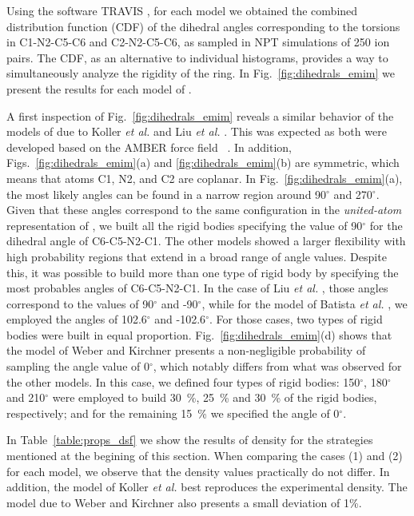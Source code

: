 \documentclass[3p,twocolumn]{elsarticle}
\begin{document}
Using the software TRAVIS \cite{Brehm_2011}, for each model we obtained the combined distribution function (CDF) of the dihedral angles corresponding to the torsions in C1-N2-C5-C6 and C2-N2-C5-C6, as sampled in NPT simulations of 250 ion pairs. The CDF, as an alternative to individual histograms, provides a way to  simultaneously analyze the rigidity of the ring. In Fig.~\ref{fig:dihedrals_emim} we present the results for each model of \ce{[emim][B(CN)_4]}.

A first inspection of Fig.~\ref{fig:dihedrals_emim} reveals a similar behavior of the models of \ce{[emim]^+} due to Koller \textit{et al.} \cite{Koller_2012} and Liu \textit{et al.} \cite{Liu_2014}. This was expected as both were developed based on the AMBER force field ~\cite{Cornell_1995}. In addition, Figs.~\ref{fig:dihedrals_emim}(a) and \ref{fig:dihedrals_emim}(b) are symmetric, which means that atoms C1, N2, and C2 are coplanar. In Fig.~\ref{fig:dihedrals_emim}(a), the most likely angles can be found in a narrow region around 90$^{\circ}$ and 270$^{\circ}$. Given that these angles correspond to the same configuration in the \textit{united-atom} representation of \ce{[emim]^+}, we built all the rigid bodies specifying the value of 90$^{\circ}$ for the dihedral angle of C6-C5-N2-C1. The other models showed a larger flexibility with high probability regions that extend in a broad range of angle values. Despite this, it was possible to build more than one type of rigid body by specifying the most probables angles of C6-C5-N2-C1. In the case of Liu \textit{et al.} \cite{Liu_2014}, those angles correspond to the values of  90$^{\circ}$ and -90$^{\circ}$, while for the model of Batista \textit{et al.} \cite{Batista_2015}, we employed the angles of 102.6$^{\circ}$ and -102.6$^{\circ}$. For those cases, two types of rigid bodies were built in equal proportion. Fig.~\ref{fig:dihedrals_emim}(d) shows that the model of Weber and Kirchner \cite{Weber_2016} presents a non-negligible probability of sampling the angle value of 0$^{\circ}$, which notably differs from what was observed for the other models. In this case, we defined four types of rigid bodies: 150$^{\circ}$, 180$^{\circ}$ and 210$^{\circ}$ were employed to build 30~\%, 25~\% and 30~\% of the rigid bodies, respectively; and for the remaining 15~\% we specified the angle of 0$^{\circ}$.

In Table~\ref{table:props_dsf} we show the results of density for the strategies mentioned at the begining of this section. When comparing the cases (1) and (2) for each model, we observe that the density values practically do not differ. In addition, the model of Koller \textit{et al.} \cite{Koller_2012} best reproduces the experimental density. The model due to Weber and Kirchner also presents a small deviation of 1\%. 
\end{document}
